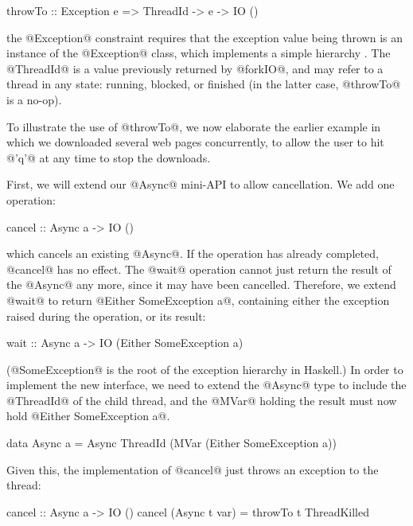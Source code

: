 \begin{haskell}
throwTo :: Exception e => ThreadId -> e -> IO ()
\end{haskell}

\noindent the @Exception@ constraint requires that the exception value
being thrown is an instance of the @Exception@ class, which implements
a simple hierarchy \cite{extensible-exceptions}.  The @ThreadId@ is a
value previously returned by @forkIO@, and may refer to a thread in
any state: running, blocked, or finished (in the latter case,
@throwTo@ is a no-op).

To illustrate the use of @throwTo@, we now elaborate the earlier
example in which we downloaded several web pages concurrently, to
allow the user to hit @'q'@ at any time to stop the downloads.

First, we will extend our @Async@ mini-API to allow cancellation.  We
add one operation:

\begin{haskell}
cancel :: Async a -> IO ()
\end{haskell}

\noindent which cancels an existing @Async@.  If the operation has
already completed, @cancel@ has no effect.  The @wait@ operation
cannot just return the result of the @Async@ any more, since it may
have been cancelled.  Therefore, we extend @wait@ to return
@Either SomeException a@, containing either the exception raised during the
operation, or its result:

\begin{haskell}
wait :: Async a -> IO (Either SomeException a)
\end{haskell}

\noindent (@SomeException@ is the root of the exception hierarchy in Haskell.)
In order to implement the new interface, we need to extend the @Async@
type to include the @ThreadId@ of the child thread, and the @MVar@
holding the result must now hold @Either SomeException a@.

\begin{haskell}
data Async a = Async ThreadId (MVar (Either SomeException a))
\end{haskell}

\noindent Given this, the implementation of @cancel@ just throws an
exception to the thread:

\begin{haskell}
cancel :: Async a -> IO ()
cancel (Async t var) = throwTo t ThreadKilled
\end{haskell}

